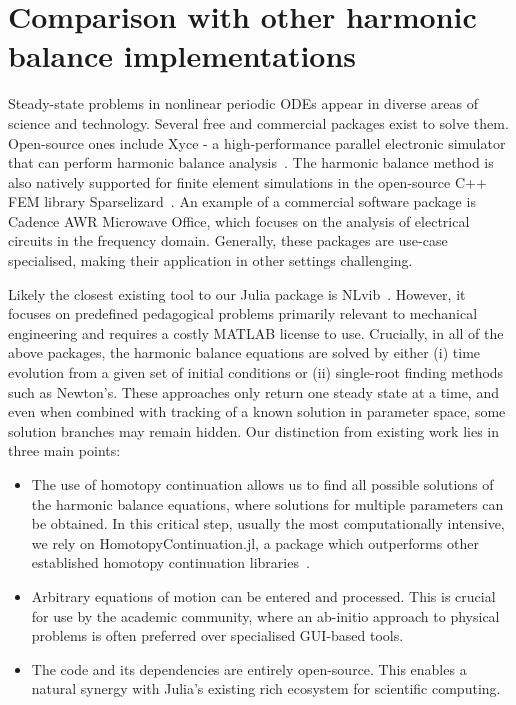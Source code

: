 \section{Comparison with other harmonic balance implementations}

Steady-state problems in nonlinear periodic ODEs appear in diverse areas of science and technology. Several free and commercial packages exist to solve them. Open-source ones include Xyce - a high-performance parallel electronic simulator that can perform harmonic balance analysis~\cite{verley2018xyce}. The harmonic balance method is also natively supported for finite element simulations in the open-source C++ FEM library Sparselizard~\cite{halbach2017sparselizard}. An example of a commercial software package is Cadence AWR Microwave Office, which focuses on the analysis of electrical circuits in the frequency domain. Generally, these packages are use-case specialised, making their application in other settings challenging.

Likely the closest existing tool to our Julia package is NLvib~\cite{Krack_2019}. However, it focuses
on predefined pedagogical problems primarily relevant to mechanical engineering and requires a costly MATLAB license to use. Crucially, in all of the above packages, the harmonic balance equations are solved by either (i) time evolution from a given set of initial conditions or (ii) single-root finding methods such as Newton's. These approaches only return one steady state at a time, and even when combined with tracking of a known solution in parameter space, some solution branches may remain hidden. Our distinction from existing work lies in three main points:
\begin{itemize}
	\item The use of homotopy continuation allows us to find all possible solutions of the harmonic balance equations, where solutions for multiple parameters can be obtained. In this critical step, usually the most computationally intensive, we rely on HomotopyContinuation.jl, a package which outperforms other established homotopy continuation libraries~\cite{Breiding_2018}.
	\item Arbitrary equations of motion can be entered and processed. This is crucial for use by the academic community, where an ab-initio approach to physical problems is often preferred over specialised GUI-based tools.
	\item The code and its dependencies are entirely open-source. This enables a natural synergy with Julia's existing rich ecosystem for scientific computing.
\end{itemize}
	
